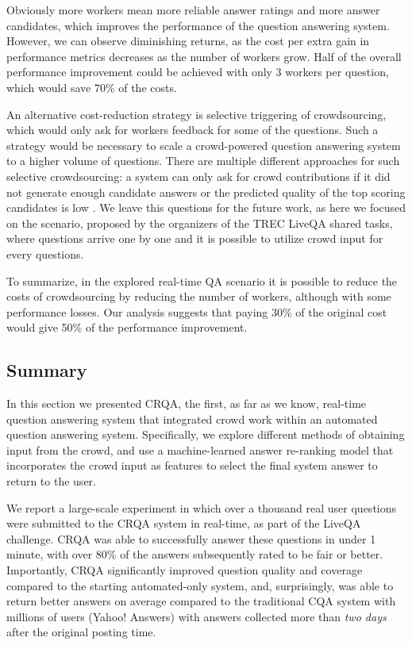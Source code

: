 Obviously more workers mean more reliable answer ratings and more answer candidates, which improves the performance of the question answering system.
However, we can observe diminishing returns, as the cost per extra gain in performance metrics decreases as the number of workers grow.
Half of the overall performance improvement could be achieved with only 3 workers per question, which would save 70\% of the costs.

An alternative cost-reduction strategy is selective triggering of crowdsourcing, which would only ask for workers feedback for some of the questions.
Such a strategy would be necessary to scale a crowd-powered question answering system to a higher volume of questions.
There are multiple different approaches for such selective crowdsourcing: \eg a system can only ask for crowd contributions if it did not generate enough candidate answers or the predicted quality of the top scoring candidates is low \cite{carmel2010estimating,he2006query}.
We leave this questions for the future work, as here we focused on the scenario, proposed by the organizers of the TREC LiveQA shared tasks, where questions arrive one by one and it is possible to utilize crowd input for every questions.

To summarize, in the explored real-time QA scenario it is possible to reduce the costs of crowdsourcing by reducing the number of workers, although with some performance losses.
Our analysis suggests that paying 30\% of the original cost would give 50\% of the performance improvement.

\subsection{Summary}

In this section we presented CRQA, the first, as far as we know, real-time question answering system that integrated crowd work within an automated question answering system.
Specifically, we explore different methods of obtaining input from the crowd, and use a machine-learned answer re-ranking model that incorporates the crowd input as features to select the final system answer to return to the user. 

We report a large-scale experiment in which over a thousand real user questions were submitted to the CRQA system in real-time, as part of the LiveQA challenge.
CRQA was able to successfully answer these questions in under 1 minute, with over 80\% of the answers subsequently rated to be fair or better.
Importantly, CRQA significantly improved question quality and coverage compared to the starting automated-only system, and, surprisingly, was able to return better answers on average compared to the traditional CQA system with millions of users (Yahoo! Answers) with answers collected more than \textit{two days} after the original posting time.

